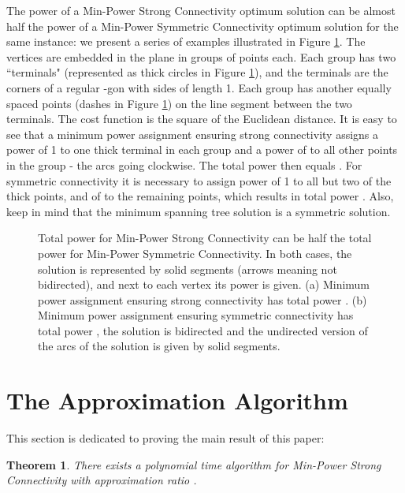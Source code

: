 \documentclass[12pt]{article}
\newtheorem{theorem}[proposition]{Theorem}
\begin{document}
The power of a Min-Power Strong Connectivity optimum solution can be
almost half the power of a Min-Power Symmetric Connectivity optimum solution
for the same instance: we present a series of examples
illustrated in Figure \ref{asymm}.  The  vertices
are embedded in the plane in  groups of  points each.
Each group has two ``terminals"
(represented as thick circles in Figure \ref{asymm}),
and the  terminals are the corners of
a regular -gon with sides of length 1.
Each group has another  equally spaced points
(dashes in Figure \ref{asymm}) on the line segment between the two terminals.
The cost function  is the square of the Euclidean distance.
It is easy to see that a minimum power assignment
ensuring strong connectivity assigns a power of 1 to one thick
terminal in each group and a power of  to all other points
 in the group - the arcs going clockwise.
The total power then equals . For symmetric
connectivity it is necessary to assign power of 1 to all but
two of the thick points, and of  to the remaining points,
which results in 
total power .
Also, keep in mind that
the minimum spanning tree solution is a symmetric solution.

\begin{figure}
\centerline{}
\caption{\label{asymm}
Total power for Min-Power Strong Connectivity can be
half the total power for Min-Power Symmetric Connectivity.
In both cases, the solution is represented by solid segments
(arrows meaning not bidirected),
and next to each vertex its power is given.
(a) Minimum power assignment ensuring strong connectivity has total
power .
 (b) Minimum power assignment ensuring symmetric connectivity has 
total power ,
the solution is bidirected and the undirected
version of the arcs of the solution is given by solid segments.
}\end{figure}


\section{The Approximation Algorithm}
\label{s_weighted}

This section is dedicated to proving the main result of this paper:


\begin{theorem}
There exists a polynomial time algorithm
for Min-Power Strong Connectivity with approximation ratio .
\label{t_main}
\end{theorem}
\end{document}
